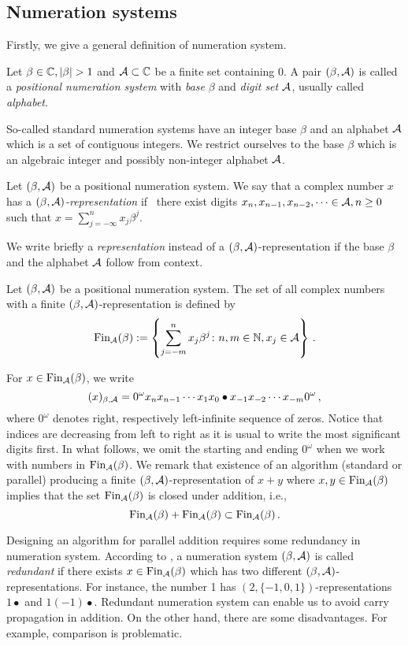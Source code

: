 \begin{upravit}
\section{Numeration systems}
Firstly, we give a general definition of numeration system.
\begin{defn}
  Let $\beta \in \CC, |\beta|>1$ and $\mathcal{A} \subset \mathbb{C}$ be a finite set containing 0. A pair $(\beta, \mathcal{A})$ is called a \emph{positional numeration system} with \emph{base} $\beta$ and \emph{digit set} $\mathcal{A}$, usually called \emph{alphabet}.
\end{defn}
So-called standard numeration systems have an integer base $\beta$ and an alphabet $\mathcal{A}$ which is a set of contiguous integers. We restrict ourselves to the base $\beta$ which is an algebraic integer and possibly non-integer alphabet $\mathcal{A}$. 
\begin{defn}
Let $(\beta, \mathcal{A})$ be a positional numeration system.  We say that a complex number $x$ has a \emph{$(\beta, \mathcal{A})$-representation} if~ there exist digits $x_n,x_{n-1}, x_{n-2},\dots \in\mathcal{A}, n\geq 0$ such that $x=\sum_{j=-\infty}^n x_j \beta^j$.
\end{defn}
 We write briefly a \emph{representation} instead of a $(\beta, \mathcal{A})$-representation if the base $\beta$ and the alphabet $\mathcal{A}$ follow from context. 

\begin{defn}
Let $(\beta, \mathcal{A})$ be a positional numeration system. The set of all complex numbers with a finite $(\beta, \mathcal{A})$-representation is defined by
$$
    \text{Fin}_{\mathcal{A}}(\beta):=\left\{\sum_{j=-m}^n x_j \beta^j\colon n, m \in \mathbb{N}, x_j \in \mathcal{A} \right\}\,.
$$
\end{defn}
   
For  $x\in\text{Fin}_{\mathcal{A}}(\beta)$, we write 
$$
(x)_{\beta,\mathcal{A}}= 0^\omega x_n x_{n-1}\cdots x_1 x_0 \bullet x_{-1} x_{-2} \cdots x_{-m} 0^\omega\,,
$$ 
where $0^\omega$ denotes right, respectively left-infinite sequence of zeros. Notice that indices are decreasing from left to right as it is usual to write the most significant digits first. In what follows, we omit the starting and ending $0^\omega$ when we work with numbers in $\text{Fin}_{\mathcal{A}}(\beta)$. We remark that existence of an algorithm (standard or parallel) producing a finite $(\beta,\mathcal{A})$-representation of $x+y$ where $x,y\in\text{Fin}_{\mathcal{A}}(\beta)$ implies that the set $\text{Fin}_{\mathcal{A}}(\beta)$ is closed under addition, i.e.,
$$
\text{Fin}_{\mathcal{A}}(\beta) + \text{Fin}_{\mathcal{A}}(\beta) \subset \text{Fin}_{\mathcal{A}}(\beta)\,.
$$ 

Designing an algorithm for parallel addition requires some redundancy in numeration system. According to \cite{redundant}, a numeration system $(\beta,\mathcal{A})$ is called \emph{redundant} if there exists $x \in \text{Fin}_{\mathcal{A}}(\beta)$ which has two different $(\beta,\mathcal{A})$-representations. For instance, the number 1 has $(2,\{-1,0,1\})$-representations $1\bullet$ and $1(-1)\bullet$.
Redundant numeration system can enable us to avoid carry propagation in addition. On the other hand, there are some disadvantages. For example, comparison is problematic.  



\end{upravit}
